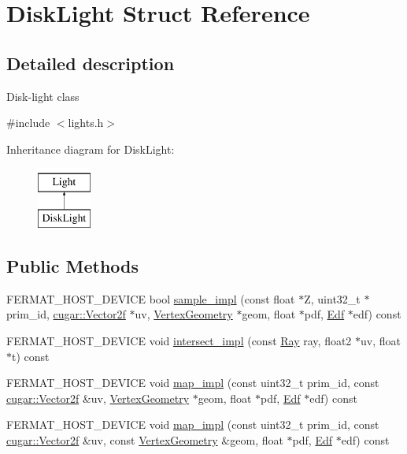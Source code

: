 \hypertarget{struct_disk_light}{}\section{Disk\+Light Struct Reference}
\label{struct_disk_light}


\subsection{Detailed description}
Disk-\/light class 

{\ttfamily \#include $<$lights.\+h$>$}

Inheritance diagram for Disk\+Light\+:\begin{figure}[H]
\begin{center}
\leavevmode
\includegraphics[height=2.000000cm]{struct_disk_light}
\end{center}
\end{figure}
\subsection*{Public Methods}
\begin{DoxyCompactItemize}
\item 
F\+E\+R\+M\+A\+T\+\_\+\+H\+O\+S\+T\+\_\+\+D\+E\+V\+I\+CE bool \hyperlink{struct_disk_light_a79772898d99e5779c17ef39d9b9ac3bd}{sample\+\_\+impl} (const float $\ast$Z, uint32\+\_\+t $\ast$prim\+\_\+id, \hyperlink{structcugar_1_1_vector}{cugar\+::\+Vector2f} $\ast$uv, \hyperlink{struct_vertex_geometry}{Vertex\+Geometry} $\ast$geom, float $\ast$pdf, \hyperlink{struct_edf}{Edf} $\ast$edf) const
\item 
F\+E\+R\+M\+A\+T\+\_\+\+H\+O\+S\+T\+\_\+\+D\+E\+V\+I\+CE void \hyperlink{struct_disk_light_a230967dac9dee2f71e7edf0b6b19f9bc}{intersect\+\_\+impl} (const \hyperlink{struct_ray}{Ray} ray, float2 $\ast$uv, float $\ast$t) const
\item 
F\+E\+R\+M\+A\+T\+\_\+\+H\+O\+S\+T\+\_\+\+D\+E\+V\+I\+CE void \hyperlink{struct_disk_light_a7be348de13a69241954e8780aad94da9}{map\+\_\+impl} (const uint32\+\_\+t prim\+\_\+id, const \hyperlink{structcugar_1_1_vector}{cugar\+::\+Vector2f} \&uv, \hyperlink{struct_vertex_geometry}{Vertex\+Geometry} $\ast$geom, float $\ast$pdf, \hyperlink{struct_edf}{Edf} $\ast$edf) const
\item 
F\+E\+R\+M\+A\+T\+\_\+\+H\+O\+S\+T\+\_\+\+D\+E\+V\+I\+CE void \hyperlink{struct_disk_light_addaaf579434c189bfd0b3f0ded4762d7}{map\+\_\+impl} (const uint32\+\_\+t prim\+\_\+id, const \hyperlink{structcugar_1_1_vector}{cugar\+::\+Vector2f} \&uv, const \hyperlink{struct_vertex_geometry}{Vertex\+Geometry} \&geom, float $\ast$pdf, \hyperlink{struct_edf}{Edf} $\ast$edf) const
\end{DoxyCompactItemize}
